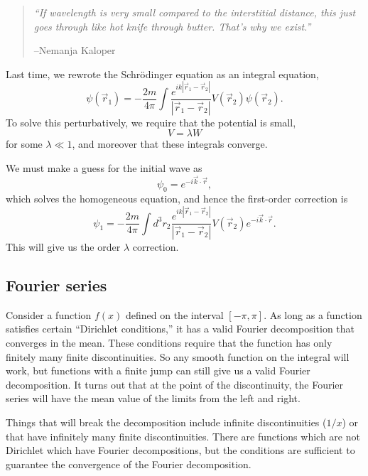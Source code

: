 \begin{quote}
    \textit{``If wavelength is very small compared to the interstitial distance, this just goes through like hot knife through butter. That's why we exist.''
    }
    
    --Nemanja Kaloper
\end{quote}
Last time, we rewrote the Schr\"odinger equation as an integral equation,
\begin{equation}
    \psi(\vec r_1) = -\frac{2m}{4\pi} \int \frac{e^{ik |\vec r_1 -\vec r_2|}}{|\vec r_1 - \vec r_2|} V(\vec r_2) \psi(\vec r_2).
\end{equation}
To solve this perturbatively, we require that the potential is small,
\begin{equation}
    V= \lambda W
\end{equation}
for some $\lambda \ll 1$, and moreover that these integrals converge.

We must make a guess for the initial wave as
\begin{equation}
    \psi_0 = e^{-i \vec k \cdot \vec r},
\end{equation}
which solves the homogeneous equation, and hence the first-order correction is
\begin{equation}
    \psi_1 = -\frac{2m}{4\pi} \int d^3r_2 \frac{e^{ik |\vec r_1 -\vec r_2|}}{|\vec r_1 - \vec r_2|} V(\vec r_2) e^{-i \vec k \cdot \vec r}.
\end{equation}
This will give us the order $\lambda$ correction.

\subsection*{Fourier series}
Consider a function $f(x)$ defined on the interval $[-\pi,\pi]$. As long as a function satisfies certain ``Dirichlet conditions,'' it has a valid Fourier decomposition that converges in the mean. These conditions require that the function has only finitely many finite discontinuities. So any smooth function on the integral will work, but functions with a finite jump can still give us a valid Fourier decomposition. It turns out that at the point of the discontinuity, the Fourier series will have the mean value of the limits from the left and right.

Things that will break the decomposition include infinite discontinuities ($1/x$) or that have infinitely many finite discontinuities. There are functions which are not Dirichlet which have Fourier decompositions, but the conditions are sufficient to guarantee the convergence of the Fourier decomposition.

